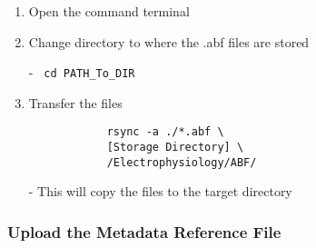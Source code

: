 \documentclass{article}
\begin{document}
\begin{itemize}
\begin{enumerate}
        \item Open the command terminal
        
        \item Change directory to where the .abf files are stored
        
        - \verb| cd PATH_To_DIR|
        
        \item Transfer the files
        
        \begin{verbatim}
            rsync -a ./*.abf \
            [Storage Directory] \
            /Electrophysiology/ABF/
        \end{verbatim}
          
        - This will copy the files to the target directory
    \end{enumerate}
\end{itemize}

\subsubsection{Upload the Metadata Reference File} \label{Upload Metadata}
\end{document}
